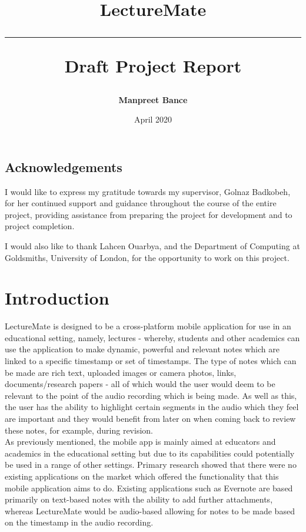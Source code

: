 \documentclass{report}
\title{\textbf{LectureMate} \vspace{0.5cm} \hrule \vspace{0.5cm} Draft Project Report}
\author{\textbf{Manpreet Bance}}
\date{April 2020}
\begin{document}
\maketitle

\tableofcontents
\newpage

\thispagestyle{empty}
\listoffigures
 
\listoftables

\newpage
	\section*{Acknowledgements}

I would like to express my gratitude towards my supervisor, Golnaz Badkobeh, for her continued support and guidance throughout the course of the entire project, providing assistance from preparing the project for development and  to project completion.\\

\par I would also like to thank Lahcen Ouarbya, and the Department of Computing at Goldsmiths, University of London, for the opportunity to work on this project.

\chapter{Introduction}
\setcounter{page}{1} %
LectureMate is designed to be a cross-platform mobile application for use in an educational setting, namely, lectures - whereby, students and other academics can use the application to make dynamic, powerful and relevant notes which are linked to a specific timestamp or set of timestamps. The type of notes which can be made are rich text, uploaded images or camera photos, links, documents/research papers - all of which would the user would deem to be relevant to the point of the audio recording which is being made. As well as this, the user has the ability to highlight certain segments in the audio which they feel are important and they would benefit from later on when coming back to review these notes, for example, during revision.\\

As previously mentioned, the mobile app is mainly aimed at educators and academics in the educational setting but due to its capabilities could potentially be used in a range of other settings. Primary research showed that there were no existing applications on the market which offered the functionality that this mobile application aims to do. Existing applications such as Evernote are based primarily on text-based notes with the ability to add further attachments, whereas LectureMate would be audio-based allowing for notes to be made based on the timestamp in the audio recording.\\
\end{document}
